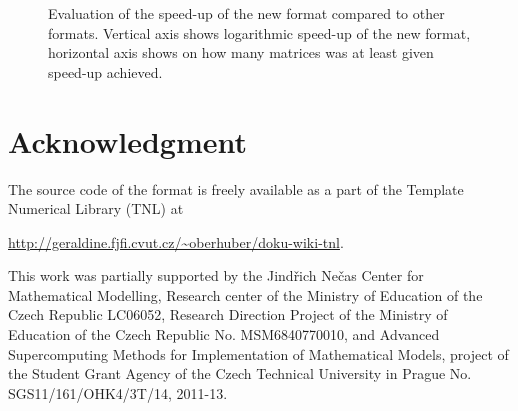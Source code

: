 \documentclass{pj}
\begin{document}
\begin{figure}[]
\caption{Evaluation of the speed-up of the new format compared to other formats. Vertical axis shows logarithmic speed-up of the new format, horizontal axis shows on how many matrices was at least given speed-up achieved.}
\label{fig:argcsr-comparison}
\end{figure}


\section*{Acknowledgment}
The source code of the format is freely available as a part of the Template Numerical Library (TNL) at 
\begin{center}
\href{http://geraldine.fjfi.cvut.cz/~oberhuber/doku-wiki-tnl}{http://geraldine.fjfi.cvut.cz/\textasciitilde  oberhuber/doku-wiki-tnl}.
\end{center}

This work was partially supported by the Jind\v{r}ich Ne\v{c}as Center for Mathematical Modelling, Research center of the Ministry of Education of the Czech Republic LC06052, Research Direction Project of the Ministry of Education of the Czech Republic No. MSM6840770010, and Advanced Supercomputing Methods for Implementation of Mathematical Models, project of the Student Grant Agency of the Czech Technical University in Prague No. SGS11/161/OHK4/3T/14, 2011-13. 
\end{document}
